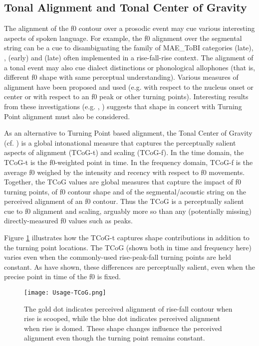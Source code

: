 \subsection{Tonal Alignment and Tonal Center of Gravity}\label{sec:TCoG}
The alignment of the f0 contour over a prosodic event may cue various interesting aspects of spoken language. For example, the f0 alignment over the segmental string can be a cue to disambiguating the family of MAE\_ToBI categories  (late), ,  (early) and  (late) often implemented in a rise-fall-rise context.  The alignment of a tonal event may also cue dialect distinctions or phonological allophones (that is, different f0 shape with same perceptual understanding).  Various measures of alignment have been proposed and used (e.g. with respect to the nucleus onset or center or with respect to an f0 peak or other turning points). Interesting results from these investigations (e.g. \citealt{niebuhr-11}, \citealt{dimperio00}) suggests that shape in concert with Turning Point alignment must also be considered.   

As an alternative to Turning Point based alignment, the Tonal Center of Gravity (cf. \citealt{barnes-10a, barnes-12}) is a global intonational measure that captures the perceptually salient aspects of alignment (TCoG-t) and scaling (TCoG-f). In the time domain, the TCoG-t is  the f0-weighted point in time. In the frequency domain, TCoG-f is the average f0 weighed by the intensity and recency with respect to f0 movements. Together, the TCoG values are global measures that capture the impact of  f0 turning points,  of f0 contour shape and of  the segmental\slash acoustic string on the perceived alignment of an f0 contour.  Thus the TCoG is a perceptually salient cue to f0 alignment and scaling, arguably more so than any (potentially missing) directly-measured f0 values such as peaks. 

Figure \ref{fig:TCoG} illustrates how the TCoG-t captures shape contributions in addition to the turning point locations. The TCoG (shown both in time and frequency here) varies even when the commonly-used rise-peak-fall turning points are held constant. As \citet{barnes-10a, barnes-12} have shown, these differences are perceptually salient, even when the precise point in time of the f0 is fixed.  

\begin{figure}[H]
\centering
%
\texttt{[image: Usage-TCoG.png]}
%
\caption{The gold dot indicates perceived alignment of rise-fall contour when rise is scooped, while the blue dot indicates perceived alignment when rise is domed. These shape changes influence the perceived alignment even though the turning point remains constant.%
\label{fig:TCoG}%
}
\end{figure}

